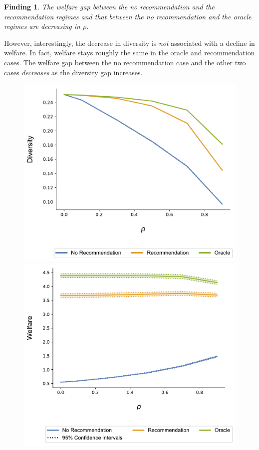 \documentclass[sigconf]{acmart}
\newtheorem{finding}{Finding}
\begin{document}
\begin{finding}\label{finding_welfare_gap}
The welfare gap between the no recommendation and the recommendation regimes and that between the no recommendation and the oracle regimes are decreasing in $\rho$.
\end{finding}
However, interestingly, the decrease in diversity is \textit{not} associated with a decline in welfare. In fact, welfare stays roughly the same in the oracle and recommendation cases. The welfare gap between the no recommendation case and the other two cases \textit{decreases} as the diversity gap increases.
\par
\begin{figure}[t]
\includegraphics[width=.9\linewidth]{figures/rho_diversity_N_200_T_20.pdf}\\
\includegraphics[width=.9\linewidth]{figures/rho_welfare_N_200_T_20.pdf}\\
\label{fig:diversity_correlation}
\end{figure}
\end{document}
